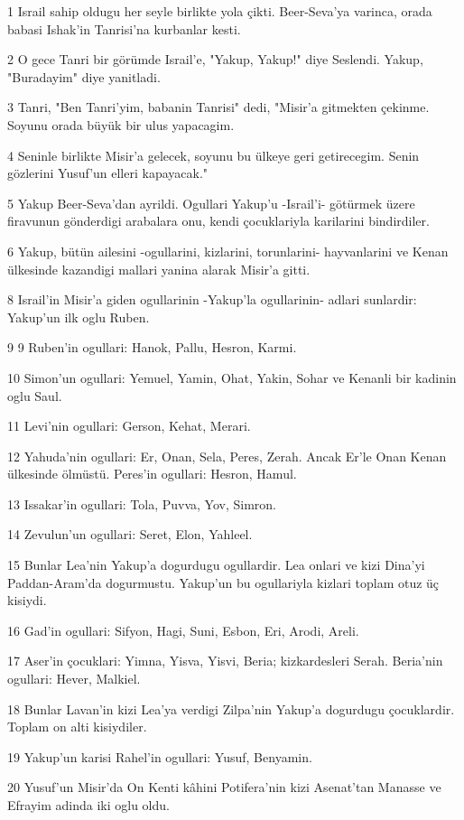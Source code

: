 \par 1 Israil sahip oldugu her seyle birlikte yola çikti. Beer-Seva'ya varinca, orada babasi Ishak'in Tanrisi'na kurbanlar kesti.
\par 2 O gece Tanri bir görümde Israil'e, "Yakup, Yakup!" diye Seslendi. Yakup, "Buradayim" diye yanitladi.
\par 3 Tanri, "Ben Tanri'yim, babanin Tanrisi" dedi, "Misir'a gitmekten çekinme. Soyunu orada büyük bir ulus yapacagim.
\par 4 Seninle birlikte Misir'a gelecek, soyunu bu ülkeye geri getirecegim. Senin gözlerini Yusuf'un elleri kapayacak."
\par 5 Yakup Beer-Seva'dan ayrildi. Ogullari Yakup'u -Israil'i- götürmek üzere firavunun gönderdigi arabalara onu, kendi çocuklariyla karilarini bindirdiler.
\par 6 Yakup, bütün ailesini -ogullarini, kizlarini, torunlarini- hayvanlarini ve Kenan ülkesinde kazandigi mallari yanina alarak Misir'a gitti.
\par 8 Israil'in Misir'a giden ogullarinin -Yakup'la ogullarinin- adlari sunlardir: Yakup'un ilk oglu Ruben.
\par 9 9 Ruben'in ogullari: Hanok, Pallu, Hesron, Karmi.
\par 10 Simon'un ogullari: Yemuel, Yamin, Ohat, Yakin, Sohar ve Kenanli bir kadinin oglu Saul.
\par 11 Levi'nin ogullari: Gerson, Kehat, Merari.
\par 12 Yahuda'nin ogullari: Er, Onan, Sela, Peres, Zerah. Ancak Er'le Onan Kenan ülkesinde ölmüstü. Peres'in ogullari: Hesron, Hamul.
\par 13 Issakar'in ogullari: Tola, Puvva, Yov, Simron.
\par 14 Zevulun'un ogullari: Seret, Elon, Yahleel.
\par 15 Bunlar Lea'nin Yakup'a dogurdugu ogullardir. Lea onlari ve kizi Dina'yi Paddan-Aram'da dogurmustu. Yakup'un bu ogullariyla kizlari toplam otuz üç kisiydi.
\par 16 Gad'in ogullari: Sifyon, Hagi, Suni, Esbon, Eri, Arodi, Areli.
\par 17 Aser'in çocuklari: Yimna, Yisva, Yisvi, Beria; kizkardesleri Serah. Beria'nin ogullari: Hever, Malkiel.
\par 18 Bunlar Lavan'in kizi Lea'ya verdigi Zilpa'nin Yakup'a dogurdugu çocuklardir. Toplam on alti kisiydiler.
\par 19 Yakup'un karisi Rahel'in ogullari: Yusuf, Benyamin.
\par 20 Yusuf'un Misir'da On Kenti kâhini Potifera'nin kizi Asenat'tan Manasse ve Efrayim adinda iki oglu oldu.
